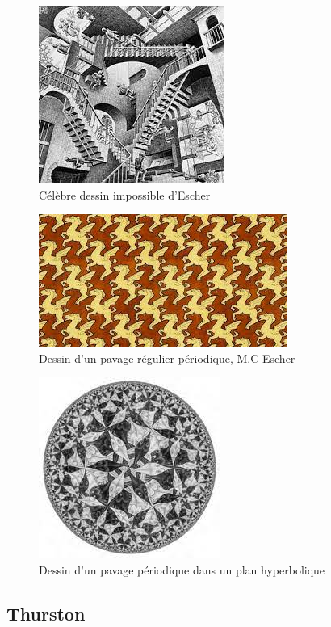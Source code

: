 \documentclass{article}
\begin{document}
\begin{figure} [!h]
    \center
    \includegraphics [scale=0.4] {image/dessin1_escherjpg.jpg}
    \caption{Célèbre dessin impossible d'Escher}
\end{figure}

\begin{figure} [!h]
    \center
    \includegraphics [scale=0.4] {image/dessin2_escherjpg.jpg}
    \caption{Dessin d'un pavage régulier périodique, M.C Escher}
\end{figure}

\begin{figure} [!h]
    \center
    \includegraphics [scale=0.4] {image/dessin3_escher.jpg}
    \caption{Dessin d'un pavage périodique dans un plan hyperbolique}
\end{figure}

\newpage

\subsection{Thurston}
\end{document}
